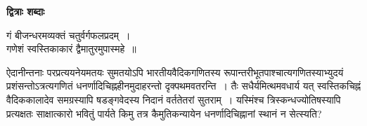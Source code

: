 \documentclass[11pt, openany]{book}
\begin{document}
\thispagestyle{empty}
\newpage
\begin{center}
    \textbf{\Large द्वित्राः शब्दाः}\\
    \vspace{5mm}
    
\q गं बीजन्धरमव्यक्तं चतुर्वर्गफलप्रदम्~।~~~~ \\
\vspace{1mm}
गणेशं स्वस्तिकाकारं द्वैमातुरमुपास्महे~॥
\end{center}

\s\onehalfspacing
\indent ऐदानीन्तनाः परप्रत्ययनेयमतयः सुमतयोऽपि भारतीयवैदिकगणितस्य 
 रूपान्तरीभूतपाश्चात्यगणितस्याभ्युदयं प्रशंसन्तोऽत्रत्यगणितं
धनर्णादिचिह्नहीनमुदाहरन्तो दृक्पथमवतरन्ति~। तैः सधैर्यमित्थमवधार्य यत्
स्वस्तिकचिह्नं वैदिककालादेव समग्रस्यापि षडङ्गवेदस्य निदानं वर्ततेतरां
सुतराम्~। यस्मिंश्च त्रिस्कन्धज्योतिषस्यापि प्रत्यक्षतः साक्षात्कारो
भवितुं
पार्यते किमु तत्र कैमुतिकन्यायेन धनर्णादिचिह्नानां स्थानं न सेत्स्यति?\\
\end{document}
